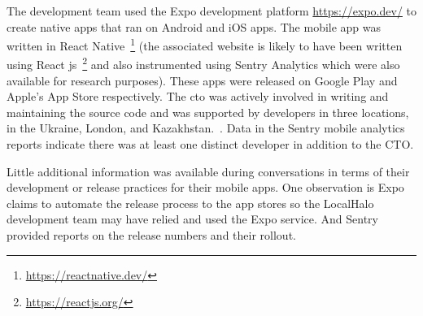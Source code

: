 The development team used the Expo development platform \url{https://expo.dev/} to create native apps that ran on Android and iOS apps. The mobile app was written in React Native~\footnote{\url{https://reactnative.dev/}} (the associated website is likely to have been written using React js~\footnote{\url{https://reactjs.org/}} and also instrumented using Sentry Analytics which were also available for research purposes). These apps were released on Google Play and Apple's App Store respectively. The \acrshort{cto} was actively involved in writing and maintaining the source code and was supported by developers in three locations, in the Ukraine, London, and Kazakhstan.~.  Data in the Sentry mobile analytics reports indicate there was at least one distinct developer in addition to the CTO.

Little additional information was available during conversations in terms of their development or release practices for their mobile apps. One observation is Expo claims to automate the release process to the app stores so the LocalHalo development team may have relied and used the Expo service. And Sentry provided reports on the release numbers and their rollout.

